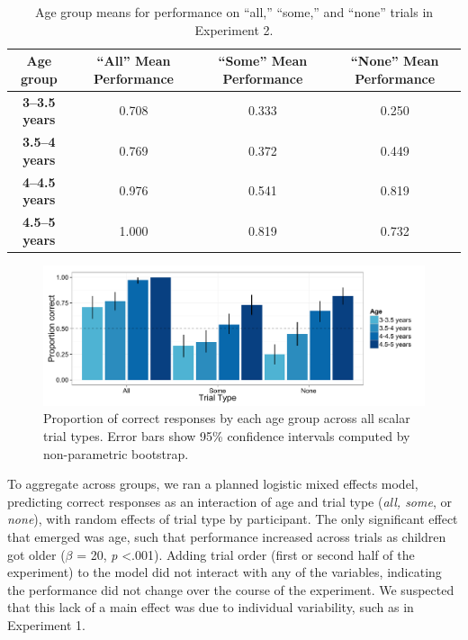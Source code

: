 \documentclass[man]{apa2}
\begin{document}
\begin{table}[h]
 \footnotesize
\centering
\begin{tabular}{cccc}
\hline
{\bf Age group} & {\bf ``All'' Mean Performance} & {\bf ``Some'' Mean Performance} & \bf{``None'' Mean Performance}\\ 
\hline
\textbf{3--3.5 years} & 0.708 & 0.333 & 0.250\\ 
\textbf{3.5--4 years} & 0.769 & 0.372 & 0.449\\
\textbf{4--4.5 years} & 0.976 & 0.541 & 0.819\\ 
\textbf{4.5--5 years} & 1.000 & 0.819 & 0.732 \\ 
\hline 
\end{tabular}
\caption{Age group means for performance on ``all,'' ``some,'' and ``none'' trials in Experiment 2. \label{tab:means} }
 \end{table}

\begin{figure} 
 \begin{center} 
  \includegraphics[scale=.5]{figures/exp2_performance.pdf} 
  \caption{\label{fig:exp2_perf} Proportion of correct responses by each age group across all scalar trial types. Error bars show 95\% confidence intervals computed by non-parametric bootstrap.} 
 \end{center} 
\end{figure}


To aggregate across groups, we ran a planned logistic mixed effects model, predicting correct responses as an interaction of age and trial type (\textit{all, some}, or \textit{none}), with random effects of trial type by participant. The only significant effect that emerged was age, such that performance increased across trials as children got older ($\beta$ = 20, \textit{p} \textless  .001). Adding trial order (first or second half of the experiment) to the model did not interact with any of the variables, indicating the performance did not change over the course of the experiment. We suspected that this lack of a main effect was due to individual variability, such as in Experiment 1. 
\end{document}
